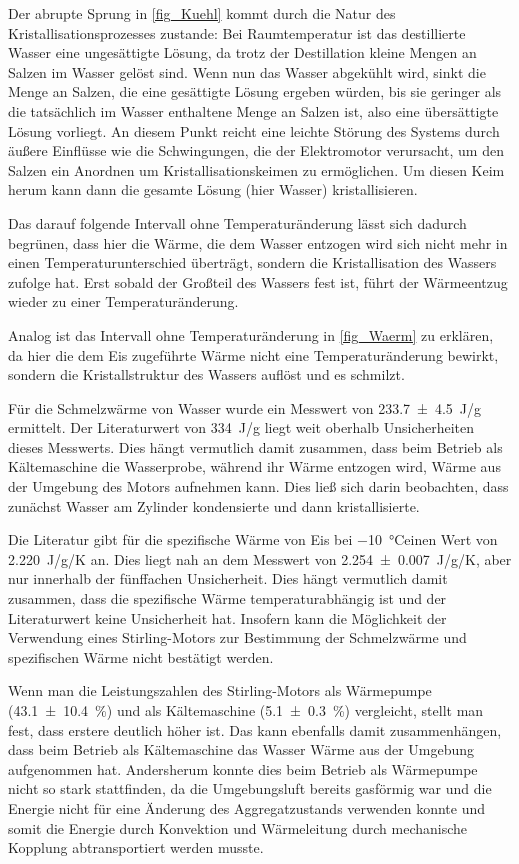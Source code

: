 \documentclass[
	a4paper,
	12pt,
	pagesize,
	ngerman
]{scrartcl}
\begin{document}
	Der abrupte Sprung in \cref{fig_Kuehl} kommt durch die Natur des Kristallisationsprozesses zustande:
	Bei Raumtemperatur ist das destillierte Wasser eine ungesättigte Lösung, da trotz der Destillation kleine Mengen an Salzen im Wasser gelöst sind.
	Wenn nun das Wasser abgekühlt wird, sinkt die Menge an Salzen, die eine gesättigte Lösung ergeben würden, bis sie geringer als die tatsächlich im Wasser enthaltene Menge an Salzen ist, also eine übersättigte Lösung vorliegt.
	An diesem Punkt reicht eine leichte Störung des Systems durch äußere Einflüsse wie die Schwingungen, die der Elektromotor verursacht, um den Salzen ein Anordnen um Kristallisationskeimen zu ermöglichen.
	Um diesen Keim herum kann dann die gesamte Lösung (hier Wasser) kristallisieren.
	
	Das darauf folgende Intervall ohne Temperaturänderung lässt sich dadurch begrünen, dass hier die Wärme, die dem Wasser entzogen wird sich nicht mehr in einen Temperaturunterschied überträgt, sondern die Kristallisation des Wassers zufolge hat.
	Erst sobald der Großteil des Wassers fest ist, führt der Wärmeentzug wieder zu einer Temperaturänderung.
	
	Analog ist das Intervall ohne Temperaturänderung in \cref{fig_Waerm} zu erklären, da hier die dem Eis zugeführte Wärme nicht eine Temperaturänderung bewirkt, sondern die Kristallstruktur des Wassers auflöst und es schmilzt.
	
	Für die Schmelzwärme von Wasser wurde ein Messwert von \SI{233,7\pm 4,5}{J/g} ermittelt.
	Der Literaturwert \cite{schmelzWarm} von \SI{334}{J/g} liegt weit oberhalb Unsicherheiten dieses Messwerts.
	Dies hängt vermutlich damit zusammen, dass beim Betrieb als Kältemaschine die Wasserprobe, während ihr Wärme entzogen wird, Wärme aus der Umgebung des Motors aufnehmen kann.
	Dies ließ sich darin beobachten, dass zunächst Wasser am Zylinder kondensierte und dann kristallisierte.
	
	Die Literatur \cite{spezWarm} gibt für die spezifische Wärme von Eis bei \SI{-10}{\degreeCelsius}einen Wert von \SI{2,220}{J/g/K} an.
	Dies liegt nah an dem Messwert von \SI{2,254\pm 0,007}{J/g/K}, aber nur innerhalb der fünffachen Unsicherheit.
	Dies hängt vermutlich damit zusammen, dass die spezifische Wärme temperaturabhängig ist und der Literaturwert keine Unsicherheit hat. %
	Insofern kann die Möglichkeit der Verwendung eines Stirling-Motors zur Bestimmung der Schmelzwärme und spezifischen Wärme nicht bestätigt werden.
	
	Wenn man die Leistungszahlen des Stirling-Motors als Wärmepumpe (\SI{43,1+-10,4}{\%}) und als Kältemaschine (\SI{5,1 +- 0,3}{\%}) vergleicht, stellt man fest, dass erstere deutlich höher ist.
	Das kann ebenfalls damit zusammenhängen, dass beim Betrieb als Kältemaschine das Wasser Wärme aus der Umgebung aufgenommen hat.
	Andersherum konnte dies beim Betrieb als Wärmepumpe nicht so stark stattfinden, da die Umgebungsluft bereits gasförmig war und die Energie nicht für eine Änderung des Aggregatzustands verwenden konnte und somit die Energie durch Konvektion und Wärmeleitung durch mechanische Kopplung abtransportiert werden musste.
	
\end{document}
